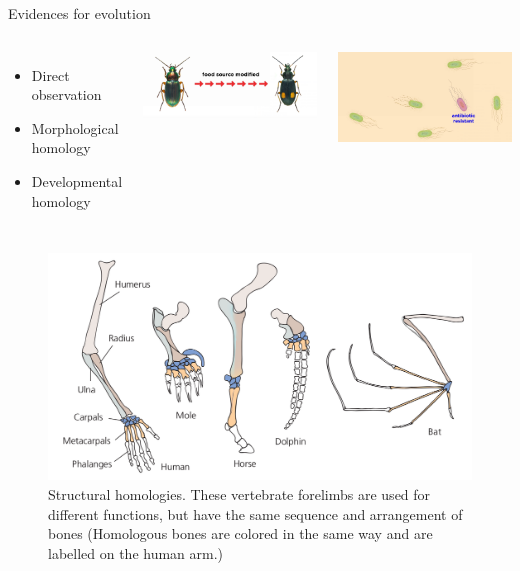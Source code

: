 \documentclass[11pt,dvipsnames,ignorenonframetext,aspectratio=169]{beamer}
\begin{document}
\begin{frame}{Evidences for evolution}
\protect\hypertarget{evidences-for-evolution}{}
\begin{columns}[T,onlytextwidth]


\begin{itemize}
\item Direct observation
\item Morphological homology
\item Developmental homology
\end{itemize}



\includegraphics[width=0.9\linewidth]{../images/insect_fooding_changes_evolution} 


\includegraphics[width=0.8\linewidth]{../images/bacterial_antibiotic_resistance} 

\end{columns}
\end{frame}

\begin{frame}{}
\protect\hypertarget{section-1}{}
\begin{figure}
\includegraphics[width=0.86\linewidth]{../images/structural_homologies_bones_human_other} \caption{Structural homologies. These vertebrate forelimbs are used for different functions, but have the same sequence and arrangement of bones (Homologous bones are colored in the same way and are labelled on the human arm.)}\label{fig:structural-homologies-bones}
\end{figure}
\end{frame}
\end{document}
